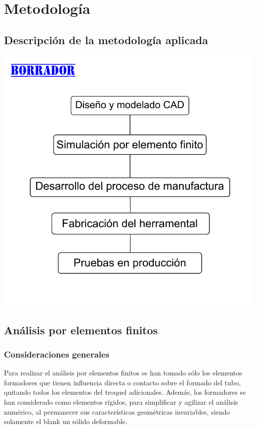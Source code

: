 \chapter{Metodología}

\section{Descripción de la metodología aplicada}

\begin{center}
\includegraphics[scale=0.75]{src/ch3/diagrama_metodologia}
\label{fig:diagrama_metodologia}
\end{center}

\section{Análisis por elementos finitos}

\subsection{Consideraciones generales}

Para realizar el análisis por elementos finitos se han tomado sólo los elementos formadores que 
tienen influencia directa o contacto sobre el formado del tubo, quitando todos los elementos 
del troquel adicionales. Además, los formadores se han considerado como elementos rígidos, 
para simplificar y agilizar el análisis numérico, al permanecer sus características geométricas 
invariables, siendo solamente el blank un sólido deformable.

